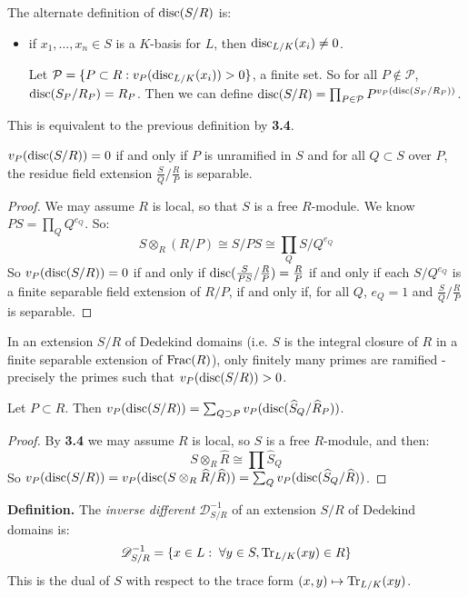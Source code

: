 \documentclass[10pt,a4paper]{article}
\begin{document}
The alternate definition of $\operatorname{disc}(S/R)$ is:
\begin{itemize}
  \item if $x_1, \ldots, x_n \in S$ is a $K$-basis for $L$, then $\operatorname{disc}_{L/K}(x_i) \neq 0$.

  Let $\mathcal{P} = \{P \subset R : v_P(\operatorname{disc}_{L/K}(x_i)) > 0\}$, a finite set. So for all $P \notin \mathcal{P}$, $\operatorname{disc}(S_P/R_P) = R_P$. Then we can define $\operatorname{disc}(S/R) = \prod_{P \in \mathcal{P}} P^{v_P(\operatorname{disc}(S_P/R_P))}$.
\end{itemize}
This is equivalent to the previous definition by \textbf{3.4}.
\begin{theorem}
  $v_P(\operatorname{disc}(S/R)) = 0$ if and only if $P$ is unramified in $S$ and for all $Q \subset S$ over $P$, the residue field extension $\frac{S}{Q}/\frac{R}{P}$ is separable.
\end{theorem}
\begin{proof}
  We may assume $R$ is local, so that $S$ is a free $R$-module. We know $PS = \prod_Q Q^{e_Q}$. So:
  \[ S \otimes_R (R/P) \cong S/PS \cong \prod_{Q} S/Q^{e_Q}\]
  So $v_P(\operatorname{disc}(S/R)) = 0$ if and only if $\operatorname{disc}(\frac{S}{PS}/\frac{R}{P}) = \frac{R}{P}$ if and only if each $S/Q^{e_Q}$ is a finite separable field extension of $R/P$, if and only if, for all $Q$, $e_Q = 1$ and $\frac{S}{Q}/\frac{R}{P}$ is separable.
\end{proof}
\begin{corollary}
  In an extension $S/R$ of Dedekind domains (i.e. $S$ is the integral closure of $R$ in a finite separable extension of $\operatorname{Frac}(R)$), only finitely many primes are ramified - precisely the primes such that $v_P(\operatorname{disc}(S/R)) > 0$.
\end{corollary}
\begin{proposition}
  Let $P \subset R$. Then $v_P(\operatorname{disc}(S/R)) = \sum_{Q\supset P}v_P(\operatorname{disc}(\widehat{S}_Q/\widehat{R}_P))$.
\end{proposition}
\begin{proof}
  By \textbf{3.4} we may assume $R$ is local, so $S$ is a free $R$-module, and then:
  \[S\otimes_R \hat{R} \cong \prod \hat{S}_Q\]
  So $v_P(\operatorname{disc}(S/R)) = v_P(\operatorname{disc}(S\otimes_R \widehat{R}/\widehat{R})) = \sum_Q v_P(\operatorname{disc}(\widehat{S}_Q/\widehat{R}))$.
\end{proof}
\textbf{Definition.} The \emph{inverse different} $\mathscr{D}_{S/R}^{-1}$ of an extension $S/R$ of Dedekind domains is:
\[\mathscr{D}_{S/R}^{-1} = \{x \in L : \forall y \in S, \Tr_{L/K}(xy) \in R\}\]
This is the dual of $S$ with respect to the trace form $(x,y) \mapsto \operatorname{Tr}_{L/K}(xy)$.
\end{document}
